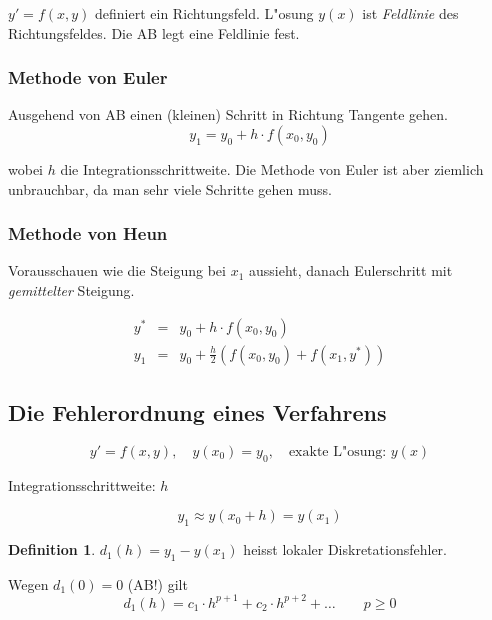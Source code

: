 \documentclass[german, 10pt, a4paper, twocolumn]{scrartcl}
\theoremstyle{definition}
\newtheorem*{definition}{Definition}
\begin{document}
$y'=f(x,y)$ definiert ein Richtungsfeld. L"osung $y(x)$ ist \textit{Feldlinie} des Richtungsfeldes. Die AB legt eine Feldlinie fest.

\subsubsection{Methode von Euler}

Ausgehend von AB einen (kleinen) Schritt in Richtung Tangente gehen.
\begin{displaymath}
	y_1 = y_0 + h\cdotp f(x_0, y_0)
\end{displaymath}

wobei $h$ die Integrationsschrittweite. Die Methode von Euler ist aber ziemlich unbrauchbar, da man sehr viele Schritte gehen muss.

\subsubsection{Methode von Heun}

Vorausschauen wie die Steigung bei $x_1$ aussieht, danach Eulerschritt mit \textit{gemittelter} Steigung.

\begin{eqnarray*}
	y^* &		= &	y_0 + h\cdotp f(x_0,y_0)\\
	y_1 &		= &	y_0 + \frac{h}{2}(f(x_0,y_0) + f(x_1,y^*))
\end{eqnarray*}

\subsection{Die Fehlerordnung eines Verfahrens}

\begin{displaymath}
	y' = f(x,y), \quad y(x_0) = y_0,\quad \text{exakte L"osung: } y(x)
\end{displaymath}

Integrationsschrittweite: $h$

\begin{displaymath}
	y_1 \approx y(x_0 + h) = y(x_1)
\end{displaymath}

\begin{definition}
	$d_1(h) = y_1 - y(x_1)$ heisst lokaler Diskretationsfehler.
\end{definition}

Wegen $d_1(0) = 0$ (AB!) gilt
\begin{displaymath}
	d_1(h) = c_1\cdotp h^{p+1} + c_2 \cdotp h^{p+2} + \ldots \qquad p \geq 0
\end{displaymath}
\end{document}
